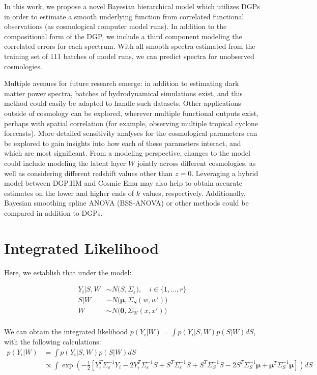 \documentclass[11pt]{article}
\begin{document}
In this work, we propose a novel Bayesian hierarchical model which utilizes DGPs 
in order to estimate a smooth underlying function from correlated functional observations 
(as cosmological computer model runs). In addition to the compositional form of the DGP, 
we include a third component modeling the correlated errors for each spectrum. 
With all smooth spectra estimated from the training set of 111 batches of model runs, 
we can predict spectra for unobserved cosmologies.

Multiple avenues for future research emerge: in addition to estimating dark matter 
power spectra, batches of hydrodynamical simulations exist, and this method could 
easily be adapted to handle such datasets. Other applications outside of cosmology 
can be explored, wherever multiple functional outputs exist, perhaps with spatial 
correlation (for example, observing multiple tropical cyclone forecasts). More detailed 
sensitivity analyses for the cosmological parameters can be explored to gain insights 
into how each of these parameters interact, and which are most significant. From a 
modeling perspective, changes to the model could include modeling the latent layer 
$W$ jointly across different cosmologies, as well as considering different redshift 
values other than $z=0$. Leveraging a hybrid model between DGP.HM and Cosmic Emu 
may also help to obtain accurate estimates on the lower and higher ends of $k$ values, 
respectively. Additionally, Bayesian smoothing spline ANOVA (BSS-ANOVA) or other methods 
could be compared in addition to DGPs. 

\appendix
\renewcommand{\thesection}{Appendix \Alph{section}}

\section{Integrated Likelihood}
\label{sec:apdx_int_lik}
Here, we establish that under the model:

$$
\begin{aligned}
Y_i|S,W &\sim N\big(S, \Sigma_\varepsilon\big), \quad i \in \{1,\dots, r\}\\
S|W &\sim N\big(\boldsymbol{\mu}, \Sigma_S(w,w')\big)\\
W &\sim N\big(\mathbf{0}, \Sigma_W(x,x')\big) \\
\end{aligned}
$$

We can obtain the integrated likelihood $p(Y_i|W)=\int p(Y_i|S,W)p(S|W) dS$, 
with the following calculations:
$$
\begin{aligned}
p(Y_i|W) &= \int p(Y_i|S,W)p(S|W)dS \\
&\propto \int\exp\left(-\frac{1}{2} \left[Y_i^T\Sigma_\varepsilon^{-1} Y_i 
- 2Y_i^T\Sigma_\varepsilon^{-1} S + S^T \Sigma_\varepsilon^{-1} S + S^T \Sigma_S^{-1} S 
-2S^T \Sigma_S^{-1} \boldsymbol{\mu} 
+ \boldsymbol{\mu}^T \Sigma_S^{-1} \boldsymbol{\mu} \right]\right)dS \\
\end{aligned}
$$
\end{document}

